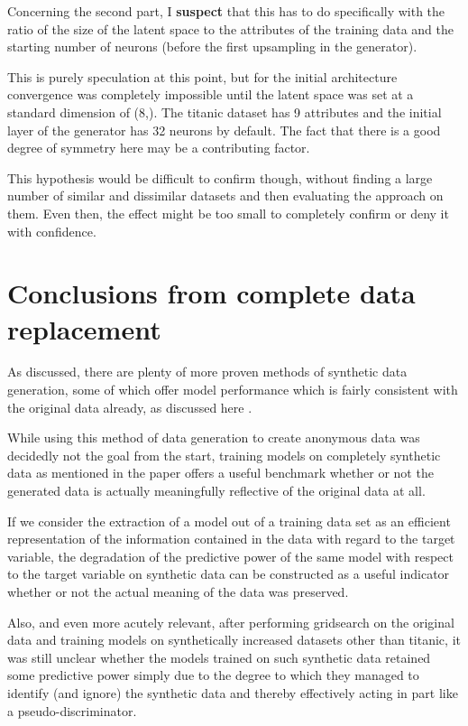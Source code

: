 Concerning the second part, I \textbf{suspect} that this has to do specifically with the ratio of the size of the latent space to the attributes of the training data and the starting number of neurons (before the first upsampling in the generator).

This is purely speculation at this point, but for the initial architecture convergence was completely impossible until the latent space was set at a standard dimension of (8,). The titanic dataset has 9 attributes and the initial layer of the generator has 32 neurons by default. The fact that there is a good degree of symmetry here may be a contributing factor.

\label{note:hypothesis}

This hypothesis would be difficult to confirm though, without finding a large number of similar and dissimilar datasets and then evaluating the approach on them. Even then, the effect might be too small to completely confirm or deny it with confidence.

\pagebreak

\section{Conclusions from complete data replacement}

As discussed, there are plenty of more proven methods of synthetic data generation, some of which offer model performance which is fairly consistent with the original data already, as discussed here \cite{ares_utility}.

While using this method of data generation to create anonymous data was decidedly not the goal from the start, training models on completely synthetic data as mentioned in the paper offers a useful benchmark whether or not the generated data is actually meaningfully reflective of the original data at all. 

If we consider the extraction of a model out of a training data set as an efficient representation of the information contained in the data with regard to the target variable, the degradation of the predictive power of the same model with respect to the target variable on synthetic data can be constructed as a useful indicator whether or not the actual meaning of the data was preserved.

Also, and even more acutely relevant, after performing gridsearch on the original data and training models on synthetically increased datasets other than titanic, it was still unclear whether the models trained on such synthetic data retained some predictive power simply due to the degree to which they managed to identify (and ignore) the synthetic data and thereby effectively acting in part like a pseudo-discriminator.

